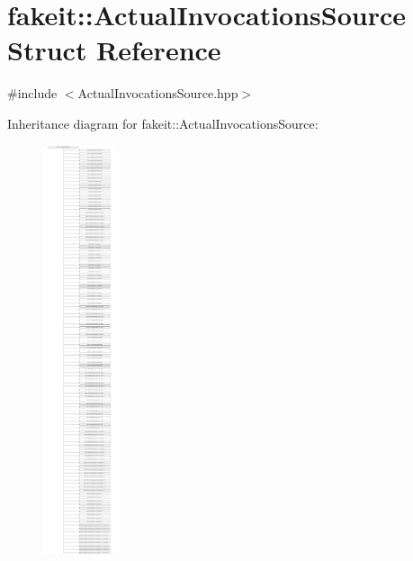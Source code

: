 \hypertarget{structfakeit_1_1ActualInvocationsSource}{}\section{fakeit\+::Actual\+Invocations\+Source Struct Reference}
\label{structfakeit_1_1ActualInvocationsSource}


{\ttfamily \#include $<$Actual\+Invocations\+Source.\+hpp$>$}

Inheritance diagram for fakeit\+::Actual\+Invocations\+Source\+:\begin{figure}[H]
\begin{center}
\leavevmode
\includegraphics[height=12.000000cm]{structfakeit_1_1ActualInvocationsSource}
\end{center}
\end{figure}
